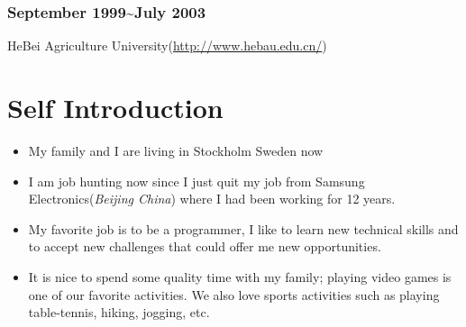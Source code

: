 \documentclass{article}
\begin{document}
\subsubsection{September 1999\~{}July 2003}
HeBei Agriculture University(\url{http://www.hebau.edu.cn/})


\section{ Self Introduction}
\begin{itemize}
\item{My family and I are living in Stockholm Sweden now}
\item{I am job hunting now since I just quit my job from Samsung Electronics(\textit{Beijing China}) where I had been working for 12 years.}

\item{My favorite job is to be a programmer, I like to learn new technical skills and to accept new challenges that could offer me new opportunities.}

\item{It is nice to spend some quality time with my family; playing video games is one of our favorite activities. We also love sports activities such as playing table-tennis, hiking, jogging, etc.}
\end{itemize}
\end{document}
